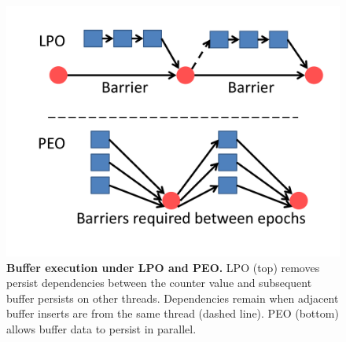 \begin{figure}
\centering
\includegraphics[width=.7\textwidth]{PMC_patterns/buffer_PEO_LPO.pdf}
\caption{\textbf{Buffer execution under LPO and PEO.}  LPO (top) removes persist dependencies between the counter value and subsequent buffer persists on other threads.  Dependencies remain when adjacent buffer inserts are from the same thread (dashed line).  PEO (bottom) allows buffer data to persist in parallel.}
\label{fig:buffer_PEO_LPO}
\end{figure}
